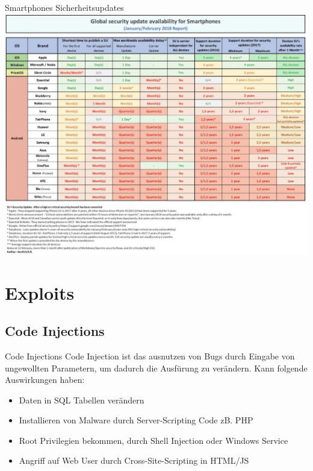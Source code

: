 \documentclass[10pt]{beamer}
\begin{document}
\begin{frame}[fragile]{Smartphones Sicherheitsupdates}
  \includegraphics[scale=0.5]{android_sub}
  \newline
\end{frame}



\section{Exploits}

\subsection{Code Injections}

\begin{frame}[fragile]{Code Injections}
  Code Injection ist das ausnutzen von Bugs durch Eingabe von ungewollten Parametern, um dadurch die Ausf\"urung zu ver\"andern.
  \newline
  Kann folgende Auswirkungen haben:
  \begin{itemize}
    \item Daten in SQL Tabellen ver\"andern
    \item Installieren von Malware durch Server-Scripting Code zB. PHP
    \item Root Privilegien bekommen, durch Shell Injection oder Windows Service
    \item Angriff auf Web User durch Cross-Site-Scripting in HTML/JS
  \end{itemize}
\end{frame}
\end{document}
